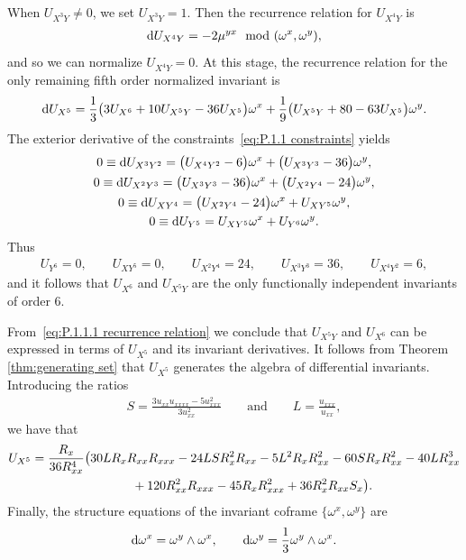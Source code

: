 \documentclass[pdftex]{sigma}%
\numberwithin{equation}{section}
\begin{document}
When $U_{X^3Y}\neq 0$, we set $U_{X^3Y}=1$. Then the recurrence relation for $U_{X^4Y}$ is
\begin{gather*}
{\rm d}U_{X^4Y} = -2\mu^{yx} \mod (\omega^x,\omega^y),
\end{gather*}
and so we can normalize $U_{X^4Y}=0$. At this stage, the recurrence relation for the only remaining fifth order normalized invariant is
%
\begin{gather}\label{eq:P.1.1.1 recurrence relation}
{\rm d}U_{X^5} = \frac{1}{3}\big(3U_{X^6}+10U_{X^5Y}-36U_{X^5}\big)\omega^x+\frac{1}{9}\big(U_{X^5Y}+80-63U_{X^5}\big)\omega^y.
\end{gather}
%
The exterior derivative of the constraints~\eqref{eq:P.1.1 constraints} yields
\begin{gather*}
0 \equiv {\rm d}U_{X^3Y^2} = \big(U_{X^4Y^2}-6\big)\omega^x+\big(U_{X^3Y^3}-36\big)\omega^y,\\
0 \equiv {\rm d}U_{X^2Y^3} = \big(U_{X^3Y^3}-36\big)\omega^x+\big(U_{X^2Y^4}-24\big)\omega^y,\\
0 \equiv {\rm d}U_{XY^4} = \big(U_{X^2Y^4}-24\big)\omega^x+U_{XY^5}\omega^y,\\
0 \equiv {\rm d}U_{Y^5} = U_{XY^5}\omega^x + U_{Y^6}\omega^y.
\end{gather*}
%
Thus
\begin{gather*}
U_{Y^6}=0,\qquad U_{XY^5}=0,\qquad U_{X^2Y^4}=24,\qquad U_{X^3Y^3}=36,\qquad
U_{X^4Y^2}=6,
\end{gather*}
and it follows that $U_{X^6}$ and $U_{X^5Y}$ are the only functionally independent invariants of order 6.

From~\eqref{eq:P.1.1.1 recurrence relation} we conclude that $U_{X^5Y}$ and $U_{X^6}$ can be expressed in terms of $U_{X^5}$ and its invariant derivatives. It follows from Theorem \ref{thm:generating set} that $U_{X^5}$ generates the algebra of differential invariants. Introducing the ratios
\begin{gather*}
S = \frac{3u_{xx} u_{xxxx} - 5 u_{xxx}^2}{3u_{xx}^2}\qquad\text{and}\qquad L=\frac{u_{xxx}}{u_{xx}},
\end{gather*}
we have that
%
\begin{gather*}
U_{X^5} = \frac{R_x}{36R_{xx}^4}\big(30 L R_x R_{xx} R_{xxx} -24 L S R_x^2 R_{xx} - 5L^2R_x R_{xx}^2 - 60 S R_x R_{xx}^2 - 40 L R_{xx}^3
\\ \hphantom{U_{X^5} =}
{}+ 120 R_{xx}^2 R_{xxx} - 45R_xR_{xxx}^2 + 36 R_x^2 R_{xx} S_x\big).
\end{gather*}
%
Finally, the structure equations of the invariant coframe $\{\omega^x,\omega^y\}$ are
\begin{gather*}
{\rm d}\omega^x = \omega^y \wedge \omega^x,\qquad {\rm d}\omega^y = \frac{1}{3}\omega^y\wedge\omega^x.
\end{gather*}
\end{document}
